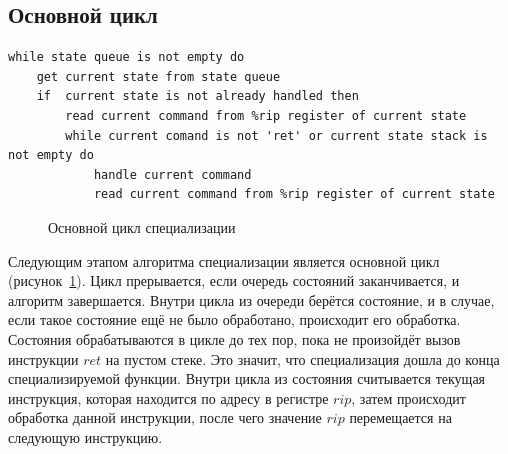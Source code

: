 \subsection{Основной цикл}
\newsavebox\boxzero
\begin{lrbox}{\boxzero}
\begin{lstlisting}[xleftmargin = 20pt]
while state queue is not empty do
    get current state from state queue
    if  current state is not already handled then
        read current command from %rip register of current state
        while current comand is not 'ret' or current state stack is not empty do
            handle current command
            read current command from %rip register of current state
\end{lstlisting}
\end{lrbox}
\begin{figure}[!t]
\centering
\subfloat{\usebox\boxzero}
\caption{Основной цикл специализации\label{fig:cycle}}
\end{figure}
Следующим этапом алгоритма специализации является основной цикл (рисунок~\ref{fig:cycle}).
Цикл прерывается, если очередь состояний заканчивается, и алгоритм завершается.
Внутри цикла из очереди берётся состояние, и в случае, если такое состояние ещё не было обработано, происходит его обработка.
Состояния обрабатываются в цикле до тех пор, пока не произойдёт вызов инструкции $ret$ на пустом стеке.
Это значит, что специализация дошла до конца специализируемой функции. Внутри цикла из состояния считывается текущая инструкция, которая находится по адресу в регистре $rip$, затем происходит обработка данной инструкции, после чего значение $rip$ перемещается на следующую инструкцию.

